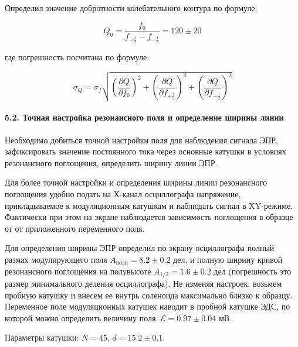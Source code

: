 \documentclass[11pt]{article}
\begin{document}
Определил значение добротности колебательного контура по формуле:

\[
Q_{0}=\frac{f_{0}}{f_{+\frac{1}{2}}-f_{-\frac{1}{2}}} = 120 \pm 20
\]

где погрешность посчитана по формуле:

\[
\sigma_{Q}=\sigma_{f} \sqrt{\left(\frac{\partial Q}{\partial f_{0}}\right)^{2}+\left(\frac{\partial Q}{\partial f_{+\frac{1}{2}}}\right)^{2}+\left(\frac{\partial Q}{\partial f_{-\frac{1}{2}}}\right)^{2}}
\]

    \hypertarget{ux442ux43eux447ux43dux430ux44f-ux43dux430ux441ux442ux440ux43eux439ux43aux430-ux440ux435ux437ux43eux43dux430ux43dux441ux43dux43eux433ux43e-ux43fux43eux43bux44f-ux438-ux43eux43fux440ux435ux434ux435ux43bux435ux43dux438ux435-ux448ux438ux440ux438ux43dux44b-ux43bux438ux43dux438ux438}{%
\paragraph{5.2. Точная настройка резонансного поля и определение ширины
линии}\label{ux442ux43eux447ux43dux430ux44f-ux43dux430ux441ux442ux440ux43eux439ux43aux430-ux440ux435ux437ux43eux43dux430ux43dux441ux43dux43eux433ux43e-ux43fux43eux43bux44f-ux438-ux43eux43fux440ux435ux434ux435ux43bux435ux43dux438ux435-ux448ux438ux440ux438ux43dux44b-ux43bux438ux43dux438ux438}}

Необходимо добиться точной настройки поля для наблюдения сигнала ЭПР,
зафиксировать значение постоянного тока через основные катушки в
условиях резонансного поглощения, определить ширину линии ЭПР.

Для более точной настройки и определения ширины линии резонансного
поглощения удобно подать на Х-канал осциллографа напряжение,
прикладываемое к модуляционным катушкам и наблюдать сигнал в XY-режиме.
Фактически при этом на экране наблюдается зависимость поглощения в
образце от от приложенного переменного поля.

Для определения ширины ЭПР определил по экрану осциллографа полный
размах модулирующего поля \(A_{\text{полн}} = 8.2 \pm 0.2\) дел, и
полную ширину кривой резонансного поглощения на полувысоте
\(A_{1/2} = 1.6 \pm 0.2\) дел (погрешность это размер минимального
деления осциллографа). Не изменяя настроек, возьмем пробную катушку и
внесем ее внутрь соленоида максимально близко к образцу. Переменное поле
модуляционных катушек наводит в пробной катушке ЭДС, по которой можно
определить величину поля. \(\mathcal{E} = 0.97 \pm 0.04\) мВ.

Параметры катушки: \(N = 45\), \(d = 15.2 \pm 0.1\).
\end{document}
